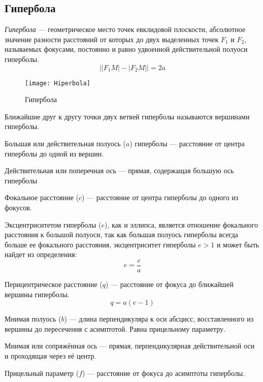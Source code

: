 \subsection{Гипербола}

\newcommand{\term}[1]{{\sffamily #1}}
 
\textit{Гипербола} --- геометрическое место точек евклидовой плоскости, абсолютное значение разности расстояний от которых до двух выделенных точек $F_1$ и $F_2$, называемых фокусами, постоянно и равно удвоенной действительной полуоси гиперболы.
\begin{equation}
\bigl||F_1M|-|F_2M|\bigr|=2a
\end{equation}
\begin{figure}[h!]
\centering
\texttt{[image: Hiperbola]}
\caption{Гипербола \label{pic:the-pic}}
\end{figure}

Ближайшие друг к другу точки двух ветвей гиперболы называются \term{вершинами} гиперболы.

\term{Большая} или \term{действительная полуось} ($a$) гиперболы --- расстояние от центра гиперболы до одной из вершин.

\term{Действительная} или \term{поперечная} ось ---  прямая, содержащая большую ось гиперболы

\term{Фокальное расстояние} ($c$) ---  расстояние от центра гиперболы до одного из фокусов.

\term{Эксцентриситетом} гиперболы ($e$), как и  эллипса, является отношение фокального расстояния к большой полуоси, так как большая полуось гиперболы всегда больше ее фокального расстояния, эксцентриситет гиперболы $e > 1$ и может быть найдет из определения:\begin{equation}
e=\frac{c}{a}
\end{equation}

\term{Перицентрическое расстояние} ($q$) --- расстояние от фокуса до ближайшей вершины гиперболы.\begin{equation}
q=a(e-1)
\end{equation}

\term{Мнимая полуось} ($b$) --- длина перпендикуляра к оси абсцисс, восставленного из вершины до пересечения с асимптотой. Равна прицельному параметру.

\term{Мнимая} или \term{сопряжённая} ось --- прямая, перпендикулярная действительной оси и проходящая через её центр.

\term{Прицельный параметр} ($f$) --- расстояние от фокуса до асимптоты гиперболы.

